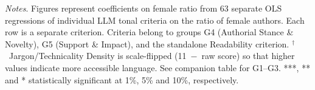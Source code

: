 \begin{table}
\begin{threeparttable}
\begin{tablenotes}
            \tiny
            \item \textit{Notes}. Figures represent coefficients on female ratio from 63 separate OLS regressions of individual LLM tonal criteria on the ratio of female authors. Each row is a separate criterion. Criteria belong to groups G4 (Authorial Stance \& Novelty), G5 (Support \& Impact), and the standalone Readability criterion. $^\dagger$~Jargon/Technicality Density is scale-flipped (11~$-$~raw score) so that higher values indicate more accessible language. See companion table for G1--G3. ***, ** and * statistically significant at 1\%, 5\% and 10\%, respectively.
        \end{tablenotes}
    \end{threeparttable}

\end{table}
